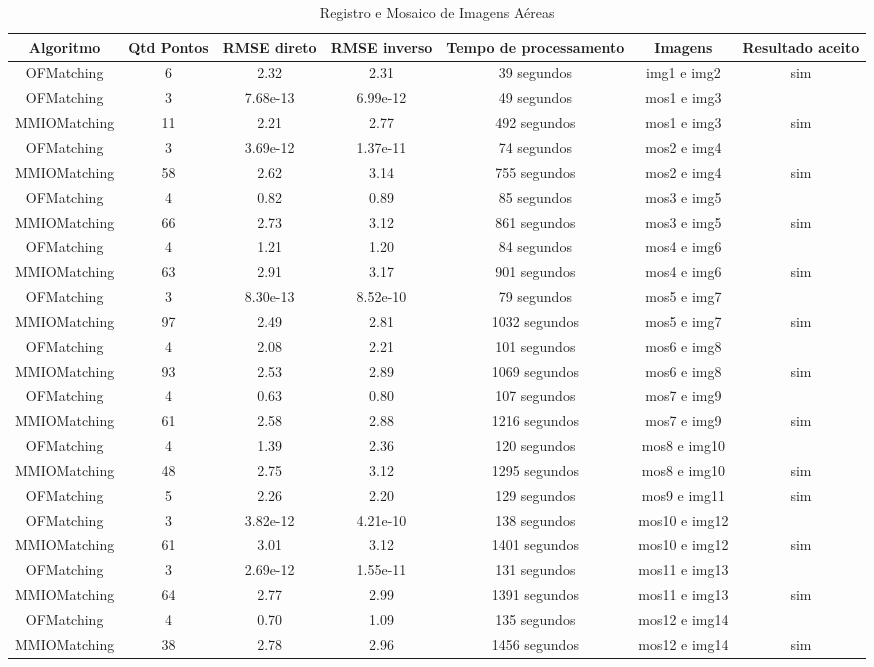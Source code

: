 \documentclass[9pt, a4paper, nofonttune, journal]{IEEEtran}
\begin{document}
\begin{table}[!hb]
\small
\caption{Registro e Mosaico de Imagens Aéreas}
\begin{center}
\begin{tabular}{ccccccc}
\hline\hline
Algoritmo   & Qtd Pontos    &RMSE direto   &RMSE inverso    &Tempo de processamento   &Imagens   & Resultado aceito\\
\hline\hline
OFMatching	&6	&2.32	&2.31	&39 segundos	&img1 e img2 &sim\\
\hline
OFMatching	&3	&7.68e-13	&6.99e-12	&49 segundos	&mos1 e img3 &\\
MMIOMatching	&11	&2.21	&2.77	&492 segundos	&mos1 e img3 &sim\\
\hline
OFMatching	&3	&3.69e-12	&1.37e-11	&74 segundos	&mos2 e img4 &\\
MMIOMatching	&58	&2.62	&3.14	&755 segundos	&mos2 e img4 &sim\\
\hline
OFMatching	&4	&0.82	&0.89	&85 segundos	&mos3 e img5 &\\
MMIOMatching	&66	&2.73	&3.12	&861 segundos	&mos3 e img5 &sim\\
\hline
OFMatching	&4	&1.21	&1.20	&84 segundos	&mos4 e img6 &\\
MMIOMatching	&63	&2.91	&3.17	&901 segundos	&mos4 e img6 &sim\\
\hline
OFMatching	&3	&8.30e-13	&8.52e-10	&79 segundos	&mos5 e img7 &\\
MMIOMatching	&97	&2.49	&2.81	&1032 segundos	&mos5 e img7 &sim\\
\hline
OFMatching	&4	&2.08	&2.21	&101 segundos	&mos6 e img8 &\\
MMIOMatching	&93	&2.53	&2.89	&1069 segundos	&mos6 e img8 &sim\\
\hline
OFMatching	&4	&0.63	&0.80	&107 segundos	&mos7 e img9 &\\
MMIOMatching	&61	&2.58	&2.88	&1216 segundos	&mos7 e img9 &sim\\
\hline
OFMatching	&4	&1.39	&2.36	&120 segundos	&mos8 e img10 &\\
MMIOMatching	&48	&2.75	&3.12	&1295 segundos	&mos8 e img10 &sim\\
\hline
OFMatching	&5	&2.26	&2.20	&129 segundos	&mos9 e img11 &sim\\
\hline
OFMatching	&3	&3.82e-12	&4.21e-10	&138 segundos	&mos10 e img12 &\\
MMIOMatching	&61	&3.01	&3.12	&1401 segundos	&mos10 e img12 &sim\\
\hline
OFMatching	&3	&2.69e-12	&1.55e-11	&131 segundos	&mos11 e img13&\\
MMIOMatching	&64	&2.77	&2.99	&1391 segundos	&mos11 e img13 &sim\\
\hline
OFMatching	&4	&0.70	&1.09	&135 segundos	&mos12 e img14&\\
MMIOMatching	&38	&2.78	&2.96	&1456 segundos	&mos12 e img14 &sim\\
\hline\hline
\end{tabular}
\label{tab:resultados}
\end{center}
\end{table}
\end{document}
